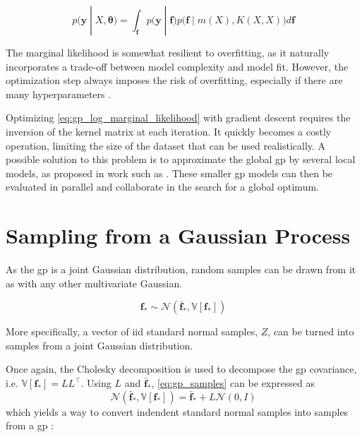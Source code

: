 \begin{equation}
    p(\boldsymbol{y} \; | \; X, \boldsymbol{\theta}) = \int_{\boldsymbol{f}} p\big(\boldsymbol{y} \;| \; \boldsymbol{f}\big) p\big(\boldsymbol{f} \; |\; m(X), K(X, X)\big) d\boldsymbol{f}
\end{equation}

The marginal likelihood is somewhat resilient to overfitting, as it naturally incorporates a trade-off between model complexity and model fit. However, the optimization step always imposes the risk of overfitting, especially if there are many hyperparameters \cite{rasmussen}. 

Optimizing \cref{eq:gp_log_marginal_likelihood} with gradient descent requires the inversion of the kernel matrix at each iteration. It quickly becomes a costly operation, limiting the size of the dataset that can be used realistically. A possible solution to this problem is to approximate the global \acrshort{gp} by several local models, as proposed in work such as \cite{paralell_gp_mle,paralell_gp_mle_2}. These smaller \acrshort{gp} models can then be evaluated in parallel and collaborate in the search for a global optimum. 

\section{Sampling from a Gaussian Process}\label{sec:gp_samples}
As the \acrshort{gp} is a joint Gaussian distribution, random samples can be drawn from it as with any other multivariate Gaussian.

\begin{equation}\label{eq:gp_samples}
    \boldsymbol{f}_* \sim \mathcal{N}(\bar{\boldsymbol{f}}_*, \mathbb{V}[\boldsymbol{f}_*])
\end{equation}

More specifically, a vector of \acrshort{iid} standard normal samples, $Z$, can be turned into samples from a joint Gaussian distribution.

Once again, the Cholesky decomposition is used to decompose the \acrshort{gp} covariance, i.e. $\mathbb{V}[\boldsymbol{f}_*] = L L^\intercal$. Using $L$ and $\bar{\boldsymbol{f}}_*$, \cref{eq:gp_samples} can be expressed as 
\begin{equation}
    \mathcal{N}(\bar{\boldsymbol{f}}_*, \mathbb{V}[\boldsymbol{f}_*]) = \bar{\boldsymbol{f}}_* + L \mathcal{N}(0, I)
\end{equation}
which yields a way to convert indendent standard normal samples into samples from a \acrshort{gp} \cite{rasmussen}:

